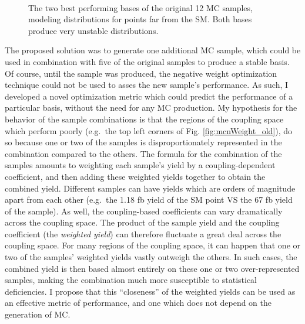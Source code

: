     \begin{figure}[tbh]
    	\centering
        \\
        \caption{
            The two best performing bases of the original 12 MC samples,
                modeling \mhh distributions for points far from the SM.
            Both bases produce very unstable distributions.
        }
        \label{fig:mcpreviews_old}
    \end{figure}


    The proposed solution was to generate one additional MC sample,
        which could be used in combination with five of the original samples to produce a stable basis.
    Of course, until the sample was produced, the negative weight optimization technique could not be used to asses the new sample's performance.
    As such, I developed a novel optimization metric which could predict the performance of a particular basis,
        without the need for any MC production.
    My hypothesis for the behavior of the sample combinations is that the regions of the coupling space which perform poorly
        (e.g.\ the top left corners of Fig. \ref{fig:mcnWeight_old}),
        do so because one or two of the samples is disproportionately represented in the combination compared to the others.
    The formula for the combination of the samples amounts to weighting each sample's yield by a coupling-dependent coefficient,
        and then adding these weighted yields together to obtain the combined yield.
    Different samples can have yields which are orders of magnitude apart from each other
        (e.g.\ the 1.18 fb yield of the SM point VS the 67 fb yield of the  sample).
    As well, the coupling-based coefficients can vary dramatically across the coupling space.
    The product of the sample yield and the coupling coefficient (the \textit{weighted yield})
        can therefore fluctuate a great deal across the coupling space.
    For many regions of the coupling space, it can happen that one or two of the samples' weighted yields vastly outweigh the others.
    In such cases, the combined yield is then based almost entirely on these one or two over-represented samples,
        making the combination much more susceptible to statistical deficiencies.
    I propose that this ``closeness'' of the weighted yields can be used as an effective metric of performance,
        and one which does not depend on the generation of MC.

